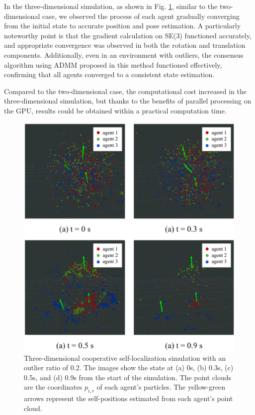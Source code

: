 \documentclass[a4paper,fleqn,10pt,twocolumn]{SICE_ISCS}
\begin{document}
In the three-dimensional simulation, as shown in Fig. \ref{fig:3d_simulation}, similar to the two-dimensional case, we observed the process of each agent gradually converging from the initial state to accurate position and pose estimation. A particularly noteworthy point is that the gradient calculation on SE(3) functioned accurately, and appropriate convergence was observed in both the rotation and translation components. Additionally, even in an environment with outliers, the consensus algorithm using ADMM proposed in this method functioned effectively, confirming that all agents converged to a consistent state estimation.

Compared to the two-dimensional case, the computational cost increased in the three-dimensional simulation, but thanks to the benefits of parallel processing on the GPU, results could be obtained within a practical computation time.

\begin{figure}[t]
	\begin{center}
		\includegraphics[width=\linewidth]{Fig/3d_simulation.eps}
		\caption{Three-dimensional cooperative self-localization simulation with an outlier ratio of 0.2. The images show the state at (a) 0s, (b) 0.3s, (c) 0.5s, and (d) 0.9s from the start of the simulation.
    The point clouds are the coordinates $p_{i,r}$ of each agent's particles. The yellow-green arrows represent the self-positions estimated from each agent's point cloud.}
		\label{fig:3d_simulation}
	\end{center}
	\vspace{-2mm}
\end{figure}
\end{document}
